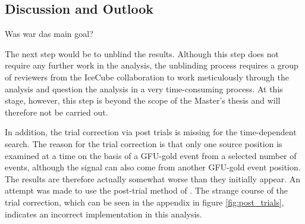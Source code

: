 %

\subsection{Discussion and Outlook}

Was war das main goal?

The next step would be to unblind the results. Although this step does not require any further work in the analysis, the unblinding process requires a group of reviewers from the IceCube collaboration to work meticulously through the analysis and question the analysis in a very time-consuming process. At this stage, however, this step is beyond the scope of the Master's thesis and will therefore not be carried out.

In addition, the trial correction via post trials is missing for the time-dependent search.
The reason for the trial correction is that only one source position is examined at a time on the basis of a GFU-gold event from a selected number of events, although the signal can also come from another GFU-gold event position.
The results are therefore actually somewhat worse than they initially appear.
An attempt was made to use the post-trial method of \cite{thorben}.
The strange course of the trial correction, which can be seen in the appendix in figure \ref{fig:post_trials}, indicates an incorrect implementation in this analysis.

